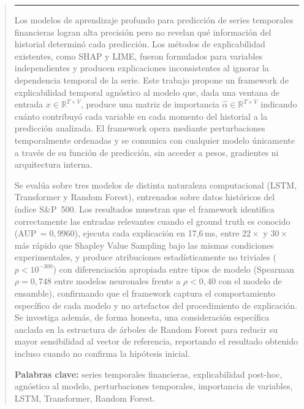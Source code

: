 
\begin{abstract}
\hrule \bigskip \vspace*{1cm}

Los modelos de aprendizaje profundo para predicción de series temporales financieras logran alta precisión pero no revelan qué información del historial determinó cada predicción. Los métodos de explicabilidad existentes, como SHAP y LIME, fueron formulados para variables independientes y producen explicaciones inconsistentes al ignorar la dependencia temporal de la serie. Este trabajo propone un framework de explicabilidad temporal agnóstico al modelo que, dada una ventana de entrada $x \in \mathbb{R}^{T \times V}$, produce una matriz de importancia $\hat{\alpha} \in \mathbb{R}^{T \times V}$ indicando cuánto contribuyó cada variable en cada momento del historial a la predicción analizada. El framework opera mediante perturbaciones temporalmente ordenadas y se comunica con cualquier modelo únicamente a través de su función de predicción, sin acceder a pesos, gradientes ni arquitectura interna.

Se evalúa sobre tres modelos de distinta naturaleza computacional (LSTM, Transformer y Random Forest), entrenados sobre datos históricos del índice S\&P~500. Los resultados muestran que el framework identifica correctamente las entradas relevantes cuando el ground truth es conocido (AUP\,$=0{,}9960$), ejecuta cada explicación en 17{,}6\,ms, entre $22{\times}$ y $30{\times}$ más rápido que Shapley Value Sampling bajo las mismas condiciones experimentales, y produce atribuciones estadísticamente no triviales ($p<10^{-300}$) con diferenciación apropiada entre tipos de modelo (Spearman $\rho=0{,}748$ entre modelos neuronales frente a $\rho<0{,}40$ con el modelo de ensamble), confirmando que el framework captura el comportamiento específico de cada modelo y no artefactos del procedimiento de explicación. Se investiga además, de forma honesta, una consideración específica anclada en la estructura de árboles de Random Forest para reducir su mayor sensibilidad al vector de referencia, reportando el resultado obtenido incluso cuando no confirma la hipótesis inicial.

\bigskip
\noindent\textbf{Palabras clave:} series temporales financieras, explicabilidad post-hoc, agnóstico al modelo, perturbaciones temporales, importancia de variables, LSTM, Transformer, Random Forest.

\end{abstract}
